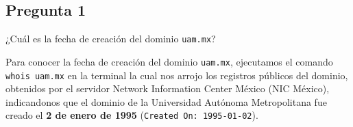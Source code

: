 \subsection{Pregunta 1}

¿Cuál es la fecha de creación del dominio \texttt{uam.mx}? 

\begin{respuesta}

Para conocer la fecha de creación del dominio \texttt{uam.mx}, ejecutamos el comando \texttt{whois uam.mx} en la terminal la cual nos arrojo los registros públicos del dominio, obtenidos por el servidor Network Information Center México (NIC México), indicandonos que el dominio de la Universidad Autónoma Metropolitana fue creado el \textbf{2 de enero de 1995} (\texttt{Created On: 1995-01-02}).

\end{respuesta}
